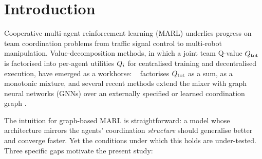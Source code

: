 
\maketitle

\section{Introduction}
\label{sec:intro}

Cooperative multi-agent reinforcement learning (MARL) underlies progress on
team coordination problems from traffic signal control to multi-robot
manipulation. Value-decomposition methods, in which a joint team Q-value
$Q_{\mathrm{tot}}$ is factorised into per-agent utilities $Q_i$ for centralised
training and decentralised execution, have emerged as a workhorse:
\vdn~\citep{sunehag_2018_vdn} factorises $Q_{\mathrm{tot}}$ as a sum, \qmix
\citep{rashid_2018_qmix,rashid_2020_qmix_jmlr} as a monotonic mixture, and
several recent methods extend the mixer with graph neural networks (GNNs)
over an externally specified or learned coordination graph
\citep{jiang_2020_dgn,liu_2020_g2anet,boehmer_2020_dcg,
       naderializadeh_2020_graphmix}.

The intuition for graph-based MARL is straightforward: a model whose
architecture mirrors the agents' coordination \emph{structure} should
generalise better and converge faster. Yet the conditions under which this
holds are under-tested. Three specific gaps motivate the present study:

